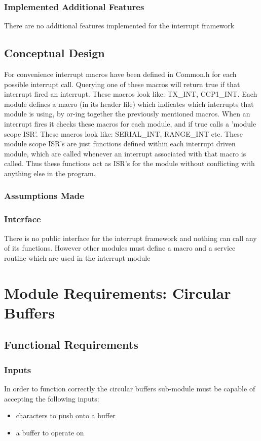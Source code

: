 \documentclass[]{report}
\begin{document}
\subsubsection{Implemented Additional Features}
There are no additional features implemented for the interrupt framework

\subsection{Conceptual Design}
For convenience interrupt macros have been defined in Common.h for each possible interrupt call. Querying one of these macros will return true if that interrupt fired an interrupt. These macros look like: TX\_INT, CCP1\_INT.\newline
Each module defines a macro (in its header file) which indicates which interrupts that module is using, by or-ing together the previously mentioned macros. When an interrupt fires it checks these macros for each module, and if true calls a 'module scope ISR'. These macros look like: SERIAL\_INT, RANGE\_INT etc. \newline
These module scope ISR's are just functions defined within each interrupt driven module, which are called whenever an interrupt associated with that macro is called. Thus these functions act as ISR's for the module without conflicting with anything else in the program.

\subsubsection{Assumptions Made}


\subsubsection{Interface}
There is no public interface for the interrupt framework and nothing can call any of its functions. However other modules must define a macro and a service routine which are used in the interrupt module

\section{Module Requirements: Circular Buffers}
\subsection{Functional Requirements}
\subsubsection{Inputs}
In order to function correctly the circular buffers sub-module must be capable of accepting the following inputs:
\begin{itemize}
	\item characters to push onto a buffer
	\item a buffer to operate on
\end{itemize}
\end{document}
